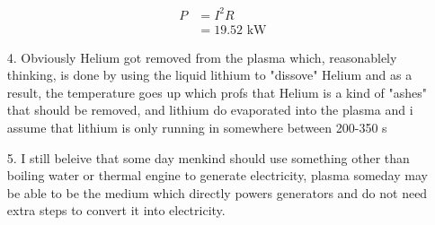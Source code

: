 \documentclass{article}
\begin{document}
\begin{itemize}
\begin{align*}
        P&=I^2R\\
        &=19.52\text{ kW}
    \end{align*}
    \item [4.]
    Obviously Helium got removed from the plasma which, reasonablely thinking, is done by using the liquid lithium to "dissove" Helium and as a result, the temperature goes up which profs that Helium is a kind of "ashes" that should be removed, and lithium do evaporated into the plasma and i assume that lithium is only running in somewhere between 200-350 s
    \item [5.]
    I still beleive that some day menkind should use something other than boiling water or thermal engine to generate electricity, plasma someday may be able to be the medium which directly powers generators and do not need extra steps to convert it into electricity.
\end{itemize}
\end{document}
